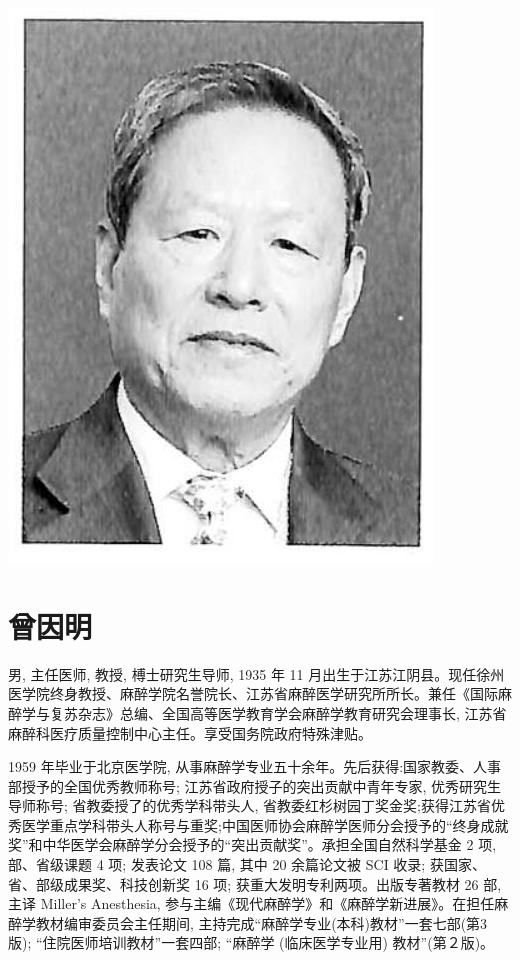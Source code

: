 \documentclass[10pt]{article}
\begin{document}
\begin{center}
\includegraphics[max width=\textwidth]{2024_07_09_002a177993bd97d1d6d7g-010}
\end{center}

\section*{曾因明}
男, 主任医师, 教授, 榑士研究生导师, 1935 年 11 月出生于江苏江阴县。现任徐州医学院终身教授、麻醉学院名誉院长、江苏省麻醉医学研究所所长。兼任《国际麻醉学与复苏杂志》总编、全国高等医学教育学会麻醉学教育研究会理事长, 江苏省麻醉科医疗质量控制中心主任。享受国务院政府特殊津贴。

1959 年毕业于北京医学院, 从事麻醉学专业五十余年。先后获得:国家教委、人事部授予的全国优秀教师称号; 江苏省政府授子的突出贡献中青年专家, 优秀研究生导师称号; 省教委授了的优秀学科带头人, 省教委红杉树园丁奖金奖;获得江苏省优秀医学重点学科带头人称号与重奖;中国医师协会麻醉学医师分会授予的“终身成就奖”和中华医学会麻醉学分会授予的“突出贡献奖”。承担全国自然科学基金 2 项, 部、省级课题 4 项; 发表论文 108 篇, 其中 20 余篇论文被 SCI 收录; 获国家、省、部级成果奖、科技创新奖 16 项; 获重大发明专利两项。出版专著教材 26 部, 主译 Miller's Anesthesia, 参与主编《现代麻醉学》和《麻醉学新进展》。在担任麻醉学教材编审委员会主任期间, 主持完成“麻醉学专业(本科)教材”一套七部(第3 版); “住院医师培训教材”一套四部; “麻醉学 (临床医学专业用) 教材”(第２版)。
\end{document}
